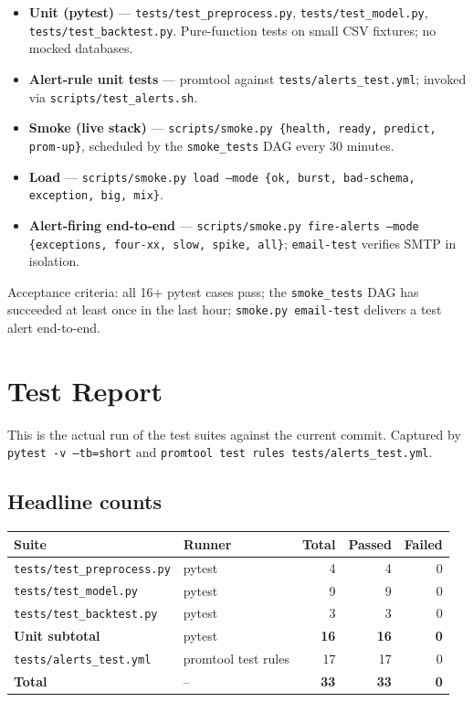 \documentclass[11pt,a4paper]{article}
\begin{document}
\begin{itemize}[leftmargin=1.5em,itemsep=0pt]
  \item \textbf{Unit (pytest)} --- \texttt{tests/test\_preprocess.py}, \texttt{tests/test\_model.py}, \texttt{tests/test\_backtest.py}. Pure-function tests on small CSV fixtures; no mocked databases.
  \item \textbf{Alert-rule unit tests} --- promtool against \texttt{tests/alerts\_test.yml}; invoked via \texttt{scripts/test\_alerts.sh}.
  \item \textbf{Smoke (live stack)} --- \texttt{scripts/smoke.py \{health, ready, predict, prom-up\}}, scheduled by the \texttt{smoke\_tests} DAG every 30 minutes.
  \item \textbf{Load} --- \texttt{scripts/smoke.py load --mode \{ok, burst, bad-schema, exception, big, mix\}}.
  \item \textbf{Alert-firing end-to-end} --- \texttt{scripts/smoke.py fire-alerts --mode \{exceptions, four-xx, slow, spike, all\}}; \texttt{email-test} verifies SMTP in isolation.
\end{itemize}

Acceptance criteria: all 16+ pytest cases pass; the \texttt{smoke\_tests} DAG has succeeded at least once in the last hour; \texttt{smoke.py email-test} delivers a test alert end-to-end.

\newpage
\section{Test Report}\label{sec:test-report}

This is the actual run of the test suites against the current commit. Captured by \texttt{pytest -v --tb=short} and \texttt{promtool test rules tests/alerts\_test.yml}.

\subsection*{Headline counts}

\begin{tabularx}{\linewidth}{@{}lXrrr@{}}
\toprule
\textbf{Suite} & \textbf{Runner} & \textbf{Total} & \textbf{Passed} & \textbf{Failed} \\
\midrule
\texttt{tests/test\_preprocess.py}  & pytest                                & 4   & 4   & 0 \\
\texttt{tests/test\_model.py}        & pytest                                & 9   & 9   & 0 \\
\texttt{tests/test\_backtest.py}    & pytest                                & 3   & 3   & 0 \\
\textbf{Unit subtotal}              & pytest                                & \textbf{16} & \textbf{16} & \textbf{0} \\
\midrule
\texttt{tests/alerts\_test.yml}      & promtool test rules                   & 17  & 17  & 0 \\
\midrule
\textbf{Total}                       & --                                    & \textbf{33} & \textbf{33} & \textbf{0} \\
\bottomrule
\end{tabularx}
\end{document}

